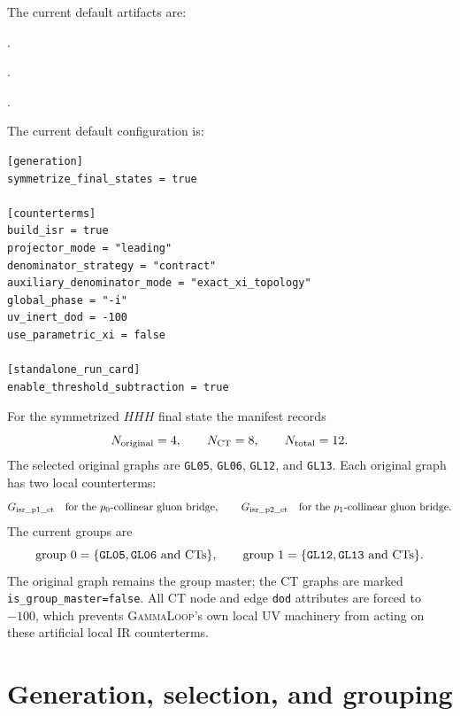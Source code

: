 \documentclass[11pt]{article}
\newcommand{\GammaLoop}{\textsc{GammaLoop}}
\newcommand{\DOT}{\textsc{dot}}
\begin{document}
The current default artifacts are:
\begin{description}[leftmargin=2.5cm,style=nextline]
\item[subtracted \DOT{}]
.
\item[run card]
.
\item[manifest]
.
\end{description}

The current default configuration is:
\begin{lstlisting}
[generation]
symmetrize_final_states = true

[counterterms]
build_isr = true
projector_mode = "leading"
denominator_strategy = "contract"
auxiliary_denominator_mode = "exact_xi_topology"
global_phase = "-i"
uv_inert_dod = -100
use_parametric_xi = false

[standalone_run_card]
enable_threshold_subtraction = true
\end{lstlisting}

For the symmetrized \(HHH\) final state the manifest records
\[
  N_{\rm original}=4,\qquad N_{\rm CT}=8,\qquad N_{\rm total}=12.
\]
The selected original graphs are \texttt{GL05}, \texttt{GL06},
\texttt{GL12}, and \texttt{GL13}.  Each original graph has two local
counterterms:
\[
  G_{\rm isr\_p1\_ct}\quad\hbox{for the \(p_0\)-collinear gluon bridge},
  \qquad
  G_{\rm isr\_p2\_ct}\quad\hbox{for the \(p_1\)-collinear gluon bridge}.
\]
The current groups are
\[
  \hbox{group 0}=\{\texttt{GL05},\texttt{GL06}\hbox{ and CTs}\},\qquad
  \hbox{group 1}=\{\texttt{GL12},\texttt{GL13}\hbox{ and CTs}\}.
\]
The original graph remains the group master; the CT graphs are marked
\texttt{is\_group\_master=false}.  All CT node and edge \texttt{dod}
attributes are forced to \(-100\), which prevents \GammaLoop{}'s own local UV
machinery from acting on these artificial local IR counterterms.

\section{Generation, selection, and grouping}
\end{document}
